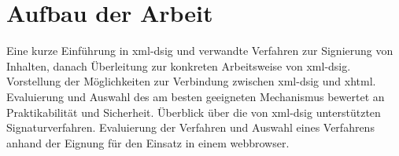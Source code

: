 \section{Aufbau der Arbeit}
\label{sec:Einleitung:aufbau}
Eine kurze Einführung in \gls{xml-dsig} und verwandte Verfahren zur Signierung von Inhalten, danach Überleitung zur konkreten Arbeitsweise von \gls{xml-dsig}.
Vorstellung der Möglichkeiten zur Verbindung zwischen \gls{xml-dsig} und \gls{xhtml}. Evaluierung und Auswahl des am besten geeigneten Mechanismus bewertet an
Praktikabilität und Sicherheit. Überblick über die von \gls{xml-dsig} unterstützten Signaturverfahren. Evaluierung der Verfahren und Auswahl eines Verfahrens
anhand der Eignung für den Einsatz in einem \gls{webbrowser}.

